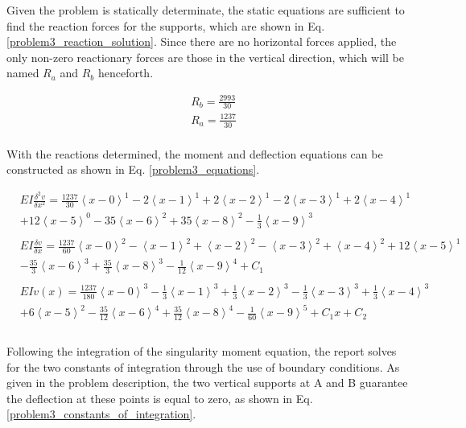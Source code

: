 \documentclass[a4paper]{article}
\begin{document}
Given the problem is statically determinate, the static equations are sufficient to find the reaction forces for the supports, which are shown in Eq. \ref{problem3_reaction_solution}. Since there are no horizontal forces applied, the only non-zero reactionary forces are those in the vertical direction, which will be named $R_a$ and $R_b$ henceforth.

\begin{equation}
\begin{split}
	& R_b = \frac{2993}{30} \\
	& R_a = \frac{1237}{30} \\
\end{split}
\label{problem3_reaction_solution}
\end{equation}

With the reactions determined, the moment and deflection equations can be constructed as shown in Eq. \ref{problem3_equations}.

\begin{equation}
    \begin{split}
& EI \frac{\delta^2 v}{\delta x^2} = \frac{1237}{30}\left<x-0\right>^1 - 2\left<x-1\right>^1 +  2\left<x-2\right>^1 - 2\left<x-3\right>^1 +  2\left<x-4\right>^1 \\
& + 12\left<x-5\right>^0 -  35\left<x-6\right>^2 + 35\left<x-8\right>^2  - \frac{1}{3}\left<x-9\right>^3 \\
& \\
& EI \frac{\delta v}{\delta x} = \frac{1237}{60}\left<x-0\right>^2 - \left<x-1\right>^2 +  \left<x-2\right>^2 - \left<x-3\right>^2 +  \left<x-4\right>^2 + 12\left<x-5\right>^1\\
& -  \frac{35}{3}\left<x-6\right>^3 + \frac{35}{3}\left<x-8\right>^3  - \frac{1}{12}\left<x-9\right>^4 + C_1 \\
& \\
& EI v(x) =\frac{1237}{180}\left<x-0\right>^3 - \frac{1}{3}\left<x-1\right>^3 +  \frac{1}{3}\left<x-2\right>^3 - \frac{1}{3}\left<x-3\right>^3 +  \frac{1}{3}\left<x-4\right>^3\\
& + 6\left<x-5\right>^2 -  \frac{35}{12}\left<x-6\right>^4 + \frac{35}{12}\left<x-8\right>^4  - \frac{1}{60}\left<x-9\right>^5 + C_1x + C_2 \\ \\
    \end{split}
\label{problem3_equations}
\end{equation}

Following the integration of the singularity moment equation, the report solves for the two constants of integration through the use of boundary conditions. As given in the problem description, the two vertical supports at A and B guarantee the deflection at these points is equal to zero, as shown in Eq. \ref{problem3_constants_of_integration}.
\end{document}
